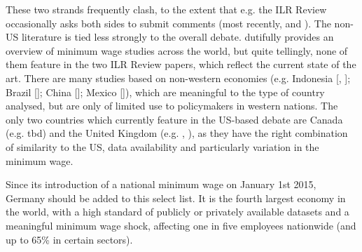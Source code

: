 These two strands frequently clash, to the extent that e.g. the ILR Review occasionally asks both sides to submit comments (most recently, \citet{Neumark2017} and \citet{Allegretto2017}). The non-US literature is tied less strongly to the overall debate. \citet{Neumark2006} dutifully provides an overview of minimum wage studies across the world, but quite tellingly, none of them feature in the two ILR Review papers, which reflect the current state of the art. There are many studies based on non-western economies (e.g. Indonesia [\citet{Comola2011}, \citet{Yamada2016}]; Brazil [\citet{Lemos2009}]; China [\citet{Long2016}]; Mexico [\citet{Feliciano1998}]), which are meaningful to the type of country analysed, but are only of limited use to policymakers in western nations. The only two countries which currently feature in the US-based debate are Canada (e.g. tbd) and the United Kingdom (e.g. \citet{Machin2003}, \citet{Metcalf2008}), as they have the right combination of similarity to the US, data availability and particularly variation in the minimum wage.

Since its introduction of a national minimum wage on January 1st 2015, Germany should be added to this select list. It is the fourth largest economy in the world, with a high standard of publicly or privately available datasets and a meaningful minimum wage shock, affecting one in five employees nationwide (and up to 65\% in certain sectors). 
